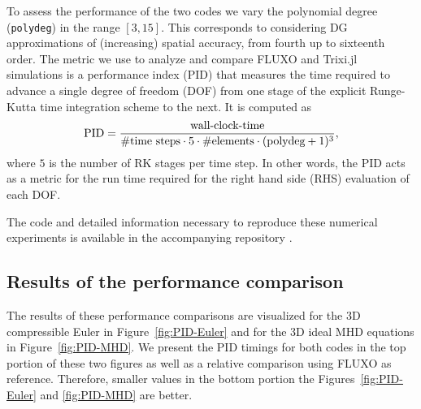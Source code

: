 \documentclass{juliacon}
\newcommand{\trixi}{Trixi.jl\xspace}
\begin{document}
To assess the performance of the two codes we vary the polynomial degree
(\lstinline{polydeg}) in the range $[3,15]$.
This corresponds to considering DG approximations of (increasing) spatial accuracy, from fourth up to sixteenth order.
The metric we use to analyze and compare FLUXO and \trixi simulations is a performance index (PID) that
measures the time required to advance a single degree of freedom (DOF) from one stage of the explicit Runge-Kutta
time integration scheme to the next. It is computed as
\begin{equation}
\label{eqn:pid}
\text{PID} = \frac{\text{wall-clock-time}}{\#\text{time steps}\cdot 5\cdot\#\text{elements}\cdot(\text{\lstinline{polydeg}}+1)^3},
\end{equation}
where $5$ is the number of RK stages per time step. In other words, the PID acts as a metric for the run time required for the right hand side (RHS) evaluation of each DOF.

The code and detailed information necessary to reproduce these numerical
experiments is available in the accompanying repository \cite{ranocha2021adaptiveRepro}.

\subsection{Results of the performance comparison}

The results of these performance comparisons are visualized for the 3D compressible Euler
in Figure~\ref{fig:PID-Euler} and for the 3D ideal MHD equations in Figure~\ref{fig:PID-MHD}.
We present the PID timings for both codes in the top portion of these two figures as well as
a relative comparison using FLUXO as reference. Therefore, smaller values in the bottom portion
the Figures~\ref{fig:PID-Euler} and \ref{fig:PID-MHD} are better.
\end{document}
